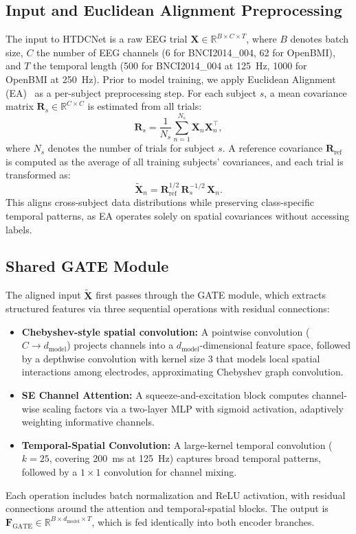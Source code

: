 \documentclass[conference]{IEEEtran}
\begin{document}
\subsection{Input and Euclidean Alignment Preprocessing}
The input to HTDCNet is a raw EEG trial $\mathbf{X} \in \mathbb{R}^{B \times C \times T}$, where $B$ denotes batch size, $C$ the number of EEG channels (6 for BNCI2014\_004, 62 for OpenBMI), and $T$ the temporal length (500 for BNCI2014\_004 at 125~Hz, 1000 for OpenBMI at 250~Hz).
Prior to model training, we apply Euclidean Alignment (EA)~\cite{he2019transfer} as a per-subject preprocessing step.
For each subject $s$, a mean covariance matrix $\mathbf{R}_s \in \mathbb{R}^{C \times C}$ is estimated from all trials:
\begin{equation}
    \mathbf{R}_s = \frac{1}{N_s} \sum_{n=1}^{N_s} \mathbf{X}_n \mathbf{X}_n^{\top},
\end{equation}
where $N_s$ denotes the number of trials for subject $s$.
A reference covariance $\mathbf{R}_{\text{ref}}$ is computed as the average of all training subjects' covariances, and each trial is transformed as:
\begin{equation}
    \tilde{\mathbf{X}}_n = \mathbf{R}_{\text{ref}}^{1/2} \, \mathbf{R}_s^{-1/2} \, \mathbf{X}_n.
\end{equation}
This aligns cross-subject data distributions while preserving class-specific temporal patterns, as EA operates solely on spatial covariances without accessing labels.

\subsection{Shared GATE Module}
The aligned input $\tilde{\mathbf{X}}$ first passes through the GATE module, which extracts structured features via three sequential operations with residual connections:
\begin{itemize}
    \item \textbf{Chebyshev-style spatial convolution:} A pointwise convolution ($C \to d_{\text{model}}$) projects channels into a $d_{\text{model}}$-dimensional feature space, followed by a depthwise convolution with kernel size 3 that models local spatial interactions among electrodes, approximating Chebyshev graph convolution.
    \item \textbf{SE Channel Attention:} A squeeze-and-excitation block computes channel-wise scaling factors via a two-layer MLP with sigmoid activation, adaptively weighting informative channels.
    \item \textbf{Temporal-Spatial Convolution:} A large-kernel temporal convolution ($k=25$, covering 200~ms at 125~Hz) captures broad temporal patterns, followed by a $1 \times 1$ convolution for channel mixing.
\end{itemize}
Each operation includes batch normalization and ReLU activation, with residual connections around the attention and temporal-spatial blocks.
The output is $\mathbf{F}_{\text{GATE}} \in \mathbb{R}^{B \times d_{\text{model}} \times T}$, which is fed identically into both encoder branches.
\end{document}
